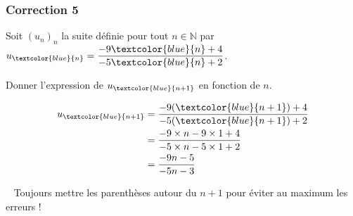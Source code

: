 \documentclass[15pt, mathserif]{beamer}
\newcommand{\N}{\mathbb{N}}			%
\begin{document}
\begin{frame}
\vspace{-10mm}
	\frametitle{Correction 5}
\vspace*{1cm} 
 Soit $(u_n)_n$ la suite définie pour tout $n \in \N$ par $u_{\textcolor{blue}{n}}=\dfrac{-9\textcolor{blue}{n}+4}{-5\textcolor{blue}{n}+2}$. 
 
 Donner l'expression de $u_{\textcolor{blue}{n+1}}$ en fonction de $n$. 
 
 \begin{align*} 
 u_{\textcolor{blue}{n+1}} 
 &= \dfrac{-9(\textcolor{blue}{n+1})+4}{-5(\textcolor{blue}{n+1})+2}\\ 
  &= \dfrac{-9\times n-9\times 1+4}{-5\times n-5\times 1 +2}\\ 
 &= \dfrac{-9n-5}{-5n-3} 
 \end{align*} 
 
 \bcattention ~ Toujours mettre les parenthèses autour du $n+1$ pour éviter au maximum les erreurs ! 
\end{frame}
\end{document}
